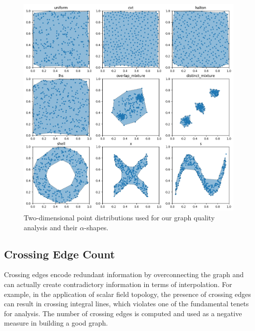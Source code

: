 \begin{figure}[t]
    \includegraphics[width=\linewidth]{figs/chap7/sample_shapes.png}
    \caption[$\alpha$-shapes of the two-dimensional distributions used for graph quality study]{Two-dimensional point distributions used for our graph quality analysis and their $\alpha$-shapes.}
    \label{fig:shapes}
\end{figure}

\subsection{Crossing Edge Count}
%
Crossing edges encode redundant information by overconnecting the graph and can actually create contradictory information in terms of interpolation.
%
For example, in the application of scalar field topology, the presence of crossing edges can result in crossing integral lines, which violates one of the fundamental tenets for analysis.
%
The number of crossing edges is computed and used as a negative measure in building a good graph.

